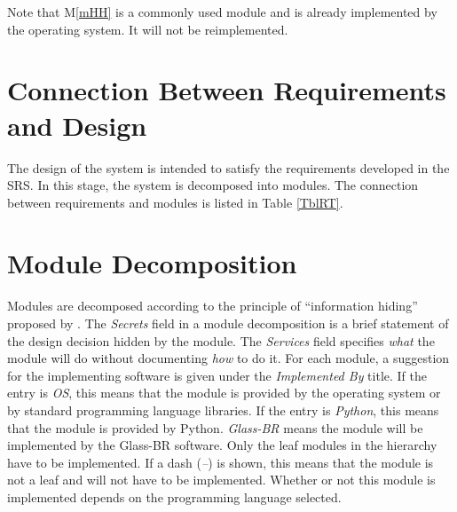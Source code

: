 \documentclass[12pt]{article}
\newcommand{\mref}[1]{M\ref{#1}}
\begin{document}
Note that \mref{mHH} is a commonly used module and is already implemented by 
the operating system.  It will not be reimplemented.

\section{Connection Between Requirements and Design} \label{SecConnection}

The design of the system is intended to satisfy the requirements developed in
the SRS. In this stage, the system is decomposed into modules. The connection
between requirements and modules is listed in Table \ref{TblRT}.

\section{Module Decomposition} \label{SecMD}

Modules are decomposed according to the principle of ``information hiding''
proposed by \citet{ParnasEtAl1984}. The \emph{Secrets} field in a module
decomposition is a brief statement of the design decision hidden by the
module. The \emph{Services} field specifies \emph{what} the module will do
without documenting \emph{how} to do it. For each module, a suggestion for the
implementing software is given under the \emph{Implemented By} title. If the
entry is \emph{OS}, this means that the module is provided by the operating
system or by standard programming language libraries. If the entry is
\emph{Python}, this means that the module is provided by Python.  
\emph{Glass-BR} means the module will be implemented by the Glass-BR software.  
Only the leaf modules in the
hierarchy have to be implemented. If a dash (\emph{--}) is shown, this means
that the module is not a leaf and will not have to be implemented. Whether or
not this module is implemented depends on the programming language
selected.
\end{document}
